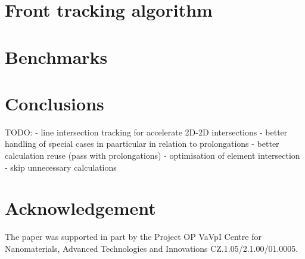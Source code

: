 \documentclass{elsarticle}
\begin{document}
\section{Front tracking algorithm}
\section{Benchmarks}

\section{Conclusions}
TODO:
- line intersection tracking for accelerate 2D-2D intersections
- better handling of special cases in paarticular in relation to prolongations
- better calculation reuse (pass with prolongations)
- optimisation of element intersection - skip unnecessary calculations
\section{Acknowledgement}
The paper was supported in part by the Project OP
VaVpI Centre for Nanomaterials, Advanced Technologies  and Innovations
CZ.1.05/2.1.00/01.0005.






% 
% 
% 
  
 
\end{document}
